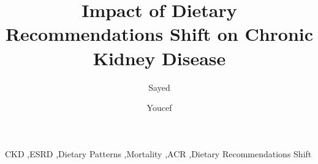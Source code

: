 \documentclass[times,twocolumn,final]{elsarticle}
\begin{document}

\begin{frontmatter}

\title{Impact of Dietary Recommendations Shift on  Chronic Kidney Disease} 


\author[1]{Sayed  } %
  
\author[2]{Youcef } %

\address[1]{Data Science Department, Ryerson University, Toronto, Canada}
\address[2]{Department of Information Technology Management, Ryerson University, Toronto, Canada}



\begin{abstract}

\end{abstract}

\begin{keyword}
\KWD CKD  \sep ESRD \sep  Dietary Patterns \sep  Mortality \sep  ACR \sep  Dietary Recommendations Shift
\end{keyword}

\end{frontmatter}
\end{document}
